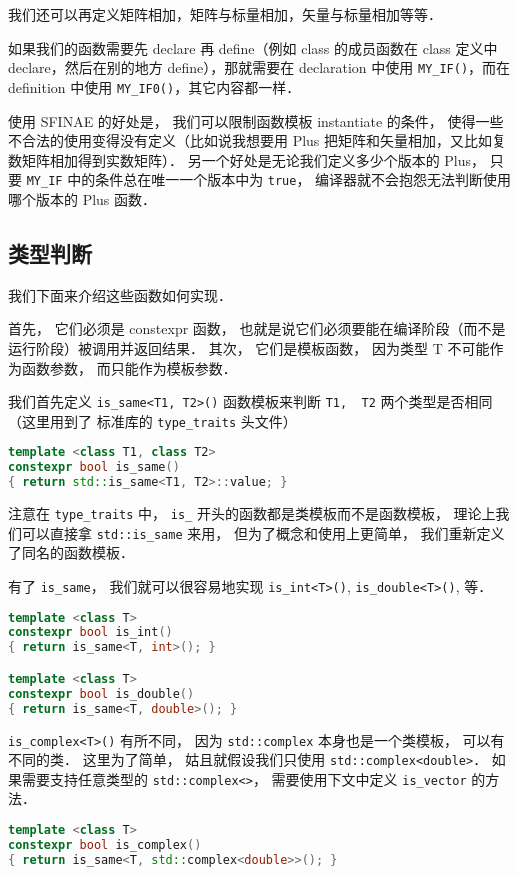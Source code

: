 我们还可以再定义矩阵相加，矩阵与标量相加，矢量与标量相加等等．

如果我们的函数需要先 declare 再 define（例如 class 的成员函数在 class 定义中 declare，然后在别的地方 define），那就需要在 declaration 中使用 \lstinline{MY_IF()}，而在 definition 中使用 \lstinline{MY_IF0()}，其它内容都一样．

使用 SFINAE 的好处是， 我们可以限制函数模板 instantiate 的条件， 使得一些不合法的使用变得没有定义（比如说我想要用 Plus 把矩阵和矢量相加，又比如复数矩阵相加得到实数矩阵）． 另一个好处是无论我们定义多少个版本的 Plus， 只要 \lstinline{MY_IF} 中的条件总在唯一一个版本中为 \lstinline{true}， 编译器就不会抱怨无法判断使用哪个版本的 Plus 函数．

\subsection{类型判断}
我们下面来介绍这些函数如何实现．

首先， 它们必须是 constexpr 函数， 也就是说它们必须要能在编译阶段（而不是运行阶段）被调用并返回结果． 其次， 它们是模板函数， 因为类型 T 不可能作为函数参数， 而只能作为模板参数．

我们首先定义 \lstinline{is_same<T1, T2>()} 函数模板来判断 \lstinline{T1,  T2} 两个类型是否相同（这里用到了 标准库的 \lstinline{type_traits} 头文件）
\begin{lstlisting}[language=cpp]
template <class T1, class T2>
constexpr bool is_same()
{ return std::is_same<T1, T2>::value; }
\end{lstlisting}

注意在 \lstinline{type_traits} 中， \lstinline{is_} 开头的函数都是类模板而不是函数模板， 理论上我们可以直接拿 \lstinline{std::is_same} 来用， 但为了概念和使用上更简单， 我们重新定义了同名的函数模板．

有了 \lstinline{is_same}， 我们就可以很容易地实现 \lstinline{is_int<T>()}, \lstinline{is_double<T>()}, 等．
\begin{lstlisting}[language=cpp]
template <class T>
constexpr bool is_int()
{ return is_same<T, int>(); }

template <class T>
constexpr bool is_double()
{ return is_same<T, double>(); }
\end{lstlisting}

\lstinline{is_complex<T>()} 有所不同， 因为 \lstinline{std::complex} 本身也是一个类模板， 可以有不同的类． 这里为了简单， 姑且就假设我们只使用 \lstinline{std::complex<double>}． 如果需要支持任意类型的 \lstinline{std::complex<>}， 需要使用下文中定义 \lstinline{is_vector} 的方法．
\begin{lstlisting}[language=cpp]
template <class T>
constexpr bool is_complex()
{ return is_same<T, std::complex<double>>(); }
\end{lstlisting}

